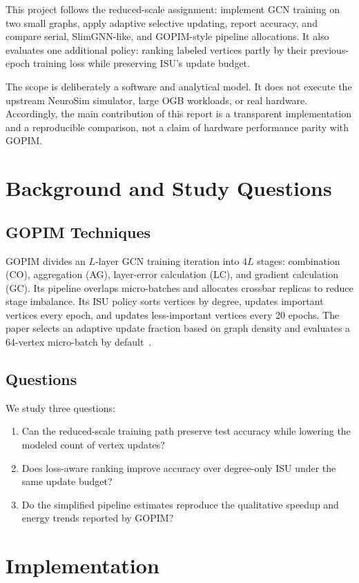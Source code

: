 \documentclass[conference]{IEEEtran}
\begin{document}
This project follows the reduced-scale assignment: implement GCN training on
two small graphs, apply adaptive selective updating, report accuracy, and
compare serial, SlimGNN-like, and GOPIM-style pipeline allocations. It also
evaluates one additional policy: ranking labeled vertices partly by their
previous-epoch training loss while preserving ISU's update budget.

The scope is deliberately a software and analytical model. It does not
execute the upstream NeuroSim simulator, large OGB workloads, or real
hardware. Accordingly, the main contribution of this report is a transparent
implementation and a reproducible comparison, not a claim of hardware
performance parity with GOPIM.

\section{Background and Study Questions}
\subsection{GOPIM Techniques}
GOPIM divides an $L$-layer GCN training iteration into $4L$ stages:
combination (CO), aggregation (AG), layer-error calculation (LC), and
gradient calculation (GC). Its pipeline overlaps micro-batches and allocates
crossbar replicas to reduce stage imbalance. Its ISU policy sorts vertices by
degree, updates important vertices every epoch, and updates less-important
vertices every 20 epochs. The paper selects an adaptive update fraction based
on graph density and evaluates a 64-vertex micro-batch by default~\cite{yang2025gopim}.

\subsection{Questions}
We study three questions:
\begin{enumerate}
  \item Can the reduced-scale training path preserve test accuracy while
  lowering the modeled count of vertex updates?
  \item Does loss-aware ranking improve accuracy over degree-only ISU under
  the same update budget?
  \item Do the simplified pipeline estimates reproduce the qualitative
  speedup and energy trends reported by GOPIM?
\end{enumerate}

\section{Implementation}
\end{document}
